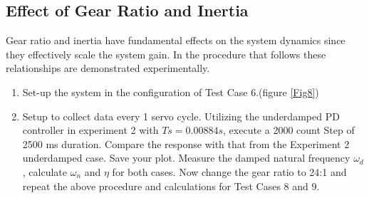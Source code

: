 \documentclass[11pt, a4paper]{article}
\begin{document}
\subsection{Effect of Gear Ratio and Inertia}
Gear ratio and inertia have fundamental effects on the system dynamics since they effectively scale the system gain. In the procedure that follows these relationships are demonstrated experimentally.
\begin{enumerate}
\item Set-up the system in the configuration of Test Case 6.(figure \ref{Fig8})
\item Setup to collect data every 1 servo cycle. Utilizing the underdamped PD controller in experiment 2 with $Ts = 0.00884 s$, execute a 2000 count Step of 2500 ms duration. Compare the response with that from the Experiment 2 underdamped case. Save your plot. Measure the damped natural frequency $\omega_d$, calculate $\omega_n$ and $\eta$ for both cases. Now change the gear ratio to 24:1 and repeat the above procedure and calculations for Test Cases 8 and 9.
\end{enumerate}
\end{document}
